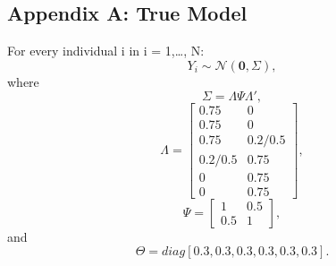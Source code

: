 \documentclass[
  man, donotrepeattitle,floatsintext]{apa6}
\begin{document}
\endgroup

\newpage

\hypertarget{appendix-appendix}{%
\appendix}


\hypertarget{appendix-a-true-model}{%
\subsection{Appendix A: True Model}\label{appendix-a-true-model}}

For every individual i in i = 1,\ldots, N:
\[Y_i \sim \mathcal{N}(\mathbf{0}, \Sigma),\] where
\[\Sigma = \Lambda\Psi\Lambda',\]
\[\Lambda = 
    \begin{bmatrix}
    0.75 & 0 \\
    0.75 & 0 \\
    0.75 & 0.2/0.5 \\
    0.2/0.5 & 0.75 \\
    0 & 0.75 \\
    0 & 0.75
    \end{bmatrix},\]
\[\Psi =
    \begin{bmatrix}
     1 & 0.5 \\
     0.5 & 1
    \end{bmatrix}
,\] and
\[\Theta = diag[0.3, 0.3, 0.3, 0.3, 0.3, 0.3].\]
\end{document}
